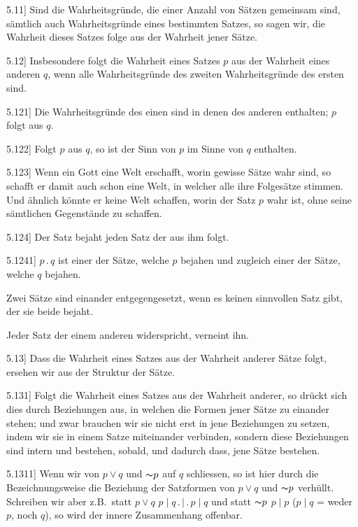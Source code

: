\documentclass[12pt,oneside]{book}[2007/10/19]
\newcommand{\PropERef}[1]{\hyperref[PropE:#1]{#1}}
\newcommand{\PropositionG}[2]{%
  \item[\phantomsection\label{PropG:#1}\PropERef{#1}] #2%
}
\newcommand{\Not}[1]{\mathord{\thicksim} #1}
\newcommand{\DotOp}{\mathbin{.}}
\newcommand{\BarOp}{\mathbin{|}}
\newcommand{\zumBeispiel}{z.\;B.}
\begin{document}
\begin{propositions}
\PropositionG{5.11}
{Sind die Wahrheitsgründe, die einer Anzahl
von Sätzen gemeinsam sind, sämtlich auch Wahrheitsgründe
eines bestimmten Satzes, so sagen
wir, die Wahrheit dieses Satzes folge aus der
Wahrheit jener Sätze.}


\PropositionG{5.12}
{Insbesondere folgt die Wahrheit eines Satzes
\glqq{}$p$\grqq{} aus der Wahrheit eines anderen \glqq{}$q$\grqq{}, wenn
alle Wahrheitsgründe des zweiten Wahrheitsgründe
des ersten sind.}


\PropositionG{5.121}
{Die Wahrheitsgründe des einen sind in denen
des anderen enthalten; $p$ folgt aus $q$.}


\PropositionG{5.122}
{Folgt $p$ aus $q$, so ist der Sinn von \glqq{}$p$\grqq{} im
Sinne von \glqq{}$q$\grqq{} enthalten.}


\PropositionG{5.123}
{Wenn ein Gott eine Welt erschafft, worin
gewisse Sätze wahr sind, so schafft er damit auch
schon eine Welt, in welcher alle ihre Folgesätze
stimmen. Und ähnlich könnte er keine Welt
schaffen, worin der Satz \glqq{}$p$\grqq{} wahr ist, ohne seine
sämtlichen Gegenstände zu schaffen.}


\PropositionG{5.124}
{Der Satz bejaht jeden Satz der aus ihm
folgt.}


\PropositionG{5.1241}
{\glqq{}$p \DotOp q$\grqq{} ist einer der Sätze, welche \glqq{}$p$\grqq{} bejahen
und zugleich einer der Sätze, welche \glqq{}$q$\grqq{}
bejahen.

Zwei Sätze sind einander entgegengesetzt, wenn
es keinen sinnvollen Satz gibt, der sie beide
bejaht.

Jeder Satz der einem anderen widerspricht,
verneint ihn.}


\PropositionG{5.13}
{Dass die Wahrheit eines Satzes aus der Wahrheit
anderer Sätze folgt, ersehen wir aus der
Struktur der Sätze.}


\PropositionG{5.131}
{Folgt die Wahrheit eines Satzes aus der Wahrheit
anderer, so drückt sich dies durch Beziehungen
aus, in welchen die Formen jener Sätze zu
einander stehen; und zwar brauchen wir sie nicht
erst in jene Beziehungen zu setzen, indem wir
sie in einem Satze miteinander verbinden, sondern
diese Beziehungen sind intern und bestehen, sobald,
und dadurch dass, jene Sätze bestehen.}


\PropositionG{5.1311}
{Wenn wir von $p \lor q$ und $\Not{p}$ auf $q$ schliessen,
so ist hier durch die Bezeichnungsweise die Beziehung
der Satzformen von \glqq{}$p \lor q$\grqq{} und \glqq{}$\Not{p}$\grqq{} verhüllt.
Schreiben wir aber \zumBeispiel\ statt \glqq{}$p \lor q$\grqq{}
\glqq{}$p \BarOp q \DotOp \BarOp \DotOp p \BarOp q$\grqq{} und statt \glqq{}$\Not{p}$\grqq{} \glqq{}$p \BarOp p$\grqq{} ($p \BarOp q$ = weder
$p$, noch $q$), so wird der innere Zusammenhang
offenbar.

}
\end{propositions}
\end{document}
